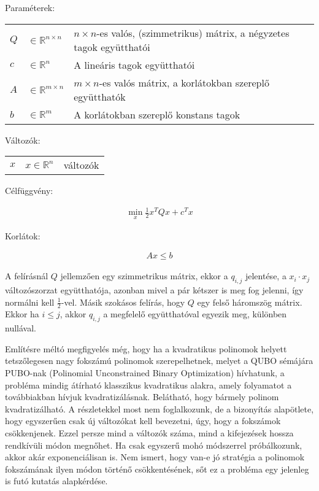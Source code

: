 Paraméterek:

\begin{tabular}{lll}
	$Q$ & $\in \mathbb{R}^{n×n}$  & $n × n$-es valós, (szimmetrikus) mátrix, a négyzetes tagok együtthatói \\
	$c$ & $\in \mathbb{R}^n$   & A lineáris tagok együtthatói \\
	$A$ & $\in \mathbb{R}^{m×n}$  & $m × n$-es valós mátrix, a korlátokban szereplő együtthatók \\
	$b$ & $\in \mathbb{R}^m$   & A korlátokban szereplő konstans tagok \\
\end{tabular}

Változók:

\begin{tabular}{lll}
	$x$ & $x \in \mathbb{R}^n$ & változók \\
\end{tabular}

Célfüggvény:

\begin{align}
	\min_{x} \frac{1}{2} x^T Q x + c^T x 
\end{align}

Korlátok:

\begin{align}
	Ax \leq b
\end{align}

A felírásnál $Q$ jellemzően egy szimmetrikus mátrix, ekkor a $q_{i,j}$ jelentése, a $x_i \cdot x_j$ változószorzat együtthatója, azonban mivel a pár kétszer is meg fog jelenni, így normálni kell $\frac{1}{2}$-vel. Másik szokásos felírás, hogy $Q$ egy felső háromszög mátrix. Ekkor ha $i \leq j$, akkor $q_{i,j}$ a megfelelő együtthatóval egyezik meg, különben nullával.

Említésre méltó megfigyelés még, hogy ha a kvadratikus polinomok helyett tetszőlegesen nagy fokszámú polinomok szerepelhetnek, melyet a QUBO sémájára PUBO-nak (Polinomial Unconstrained Binary Optimization) hívhatunk, a probléma mindig átírható klasszikus kvadratikus alakra, amely folyamatot a továbbiakban hívjuk kvadratizálásnak. Belátható, hogy bármely polinom kvadratizálható. A részletekkel most nem foglalkozunk, de a bizonyítás alapötlete, hogy egyszerűen csak új változókat kell bevezetni, úgy, hogy a fokszámok csökkenjenek. Ezzel persze mind a változók száma, mind a kifejezések hossza rendkívüli módon megnőhet. Ha csak egyszerű mohó módszerrel próbálkozunk, akkor akár exponenciálisan is. Nem ismert, hogy van-e jó stratégia a polinomok fokszámának ilyen módon történő csökkentésének, sőt ez a probléma egy jelenleg is futó kutatás alapkérdése.

